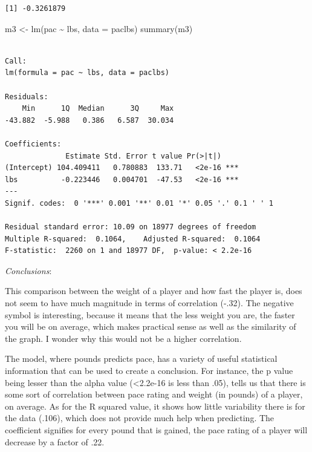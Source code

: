 \documentclass[
  letterpaper,
  DIV=11,
  numbers=noendperiod]{scrartcl}
\newenvironment{Shaded}{\begin{snugshade}}{\end{snugshade}}
\newcommand{\AttributeTok}[1]{\textcolor[rgb]{0.40,0.45,0.13}{#1}}
\newcommand{\FunctionTok}[1]{\textcolor[rgb]{0.28,0.35,0.67}{#1}}
\newcommand{\NormalTok}[1]{\textcolor[rgb]{0.00,0.23,0.31}{#1}}
\newcommand{\OtherTok}[1]{\textcolor[rgb]{0.00,0.23,0.31}{#1}}
\newcommand{\SpecialCharTok}[1]{\textcolor[rgb]{0.37,0.37,0.37}{#1}}
\begin{document}
\begin{verbatim}
[1] -0.3261879
\end{verbatim}

\begin{Shaded}
\begin{Highlighting}[]
\NormalTok{m3 }\OtherTok{\textless{}{-}} \FunctionTok{lm}\NormalTok{(pac }\SpecialCharTok{\textasciitilde{}}\NormalTok{ lbs, }\AttributeTok{data =}\NormalTok{ paclbs)}
\FunctionTok{summary}\NormalTok{(m3)}
\end{Highlighting}
\end{Shaded}

\begin{verbatim}

Call:
lm(formula = pac ~ lbs, data = paclbs)

Residuals:
    Min      1Q  Median      3Q     Max 
-43.882  -5.988   0.386   6.587  30.034 

Coefficients:
              Estimate Std. Error t value Pr(>|t|)    
(Intercept) 104.409411   0.780883  133.71   <2e-16 ***
lbs          -0.223446   0.004701  -47.53   <2e-16 ***
---
Signif. codes:  0 '***' 0.001 '**' 0.01 '*' 0.05 '.' 0.1 ' ' 1

Residual standard error: 10.09 on 18977 degrees of freedom
Multiple R-squared:  0.1064,    Adjusted R-squared:  0.1064 
F-statistic:  2260 on 1 and 18977 DF,  p-value: < 2.2e-16
\end{verbatim}

\emph{Conclusions}:

This comparison between the weight of a player and how fast the player
is, does not seem to have much magnitude in terms of correlation (-.32).
The negative symbol is interesting, because it means that the less
weight you are, the faster you will be on average, which makes practical
sense as well as the similarity of the graph. I wonder why this would
not be a higher correlation.

The model, where pounds predicts pace, has a variety of useful
statistical information that can be used to create a conclusion. For
instance, the p value being lesser than the alpha value
(\textless2.2e-16 is less than .05), tells us that there is some sort of
correlation between pace rating and weight (in pounds) of a player, on
average. As for the R squared value, it shows how little variability
there is for the data (.106), which does not provide much help when
predicting. The coefficient signifies for every pound that is gained,
the pace rating of a player will decrease by a factor of .22.
\end{document}
